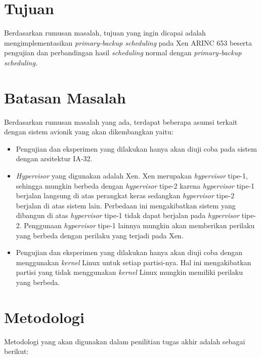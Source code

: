 \section{Tujuan}

Berdasarkan rumusan masalah, tujuan yang ingin dicapai adalah mengimplementasikan \textit{primary-backup scheduling} pada Xen ARINC 653 beserta pengujian dan perbandingan hasil \textit{scheduling} normal dengan \textit{primary-backup scheduling.}


\section{Batasan Masalah}
\label{section:batasan_masalah}

Berdasarkan rumusan masalah yang ada, terdapat beberapa asumsi terkait dengan sistem avionik yang akan dikembangkan yaitu:

\begin{itemize}

    \item Pengujian dan eksperimen yang dilakukan hanya akan diuji coba pada sistem dengan arsitektur IA-32.
    \item \textit{Hypervisor} yang digunakan adalah Xen.  Xen merupakan \textit{hypervisor} tipe-1, sehingga mungkin berbeda dengan \textit{hypervisor} tipe-2 karena \textit{hypervisor} tipe-1 berjalan langsung di atas perangkat keras sedangkan \textit{hypervisor} tipe-2 berjalan di atas sistem lain.
        Perbedaan ini mengakibatkan sistem yang dibangun di atas \textit{hypervisor} tipe-1 tidak dapat berjalan pada \textit{hypervisor} tipe-2.
        Penggunaan \textit{hypervisor} tipe-1 lainnya mungkin akan memberikan perilaku yang berbeda dengan perilaku yang terjadi pada Xen.
    \item Pengujian dan eksperimen yang dilakukan hanya akan diuji coba dengan menggunakan \textit{kernel} Linux untuk setiap partisi-nya.
        Hal ini mengakibatkan partisi yang tidak menggunakan \textit{kernel} Linux mungkin memiliki perilaku yang berbeda.

\end{itemize}

\section{Metodologi}

Metodologi yang akan digunakan dalam penilitian tugas akhir adalah sebagai berikut:

